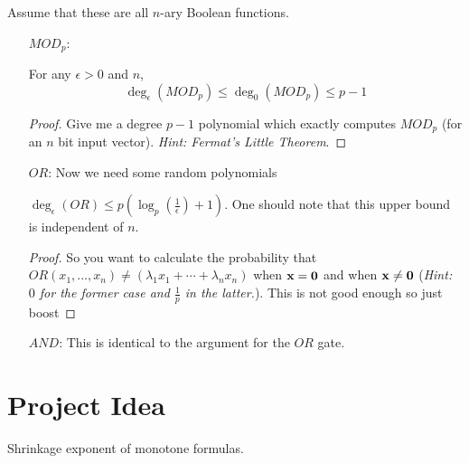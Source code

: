 \documentclass[11pt]{article}
\begin{document}
	Assume that these are all $n$-ary Boolean functions.
	\begin{enumerate}
		\item[$MOD_p$:]
		\begin{lemma}
			For any $\epsilon > 0$ and $n$,
			\[\deg_{\epsilon}(MOD_p) \leq \deg_{0}(MOD_p) \leq p-1\]
		\end{lemma}
		\begin{proof}
			Give me a degree $p-1$ polynomial which exactly computes $MOD_p$ (for an $n$ bit input vector). \emph{Hint: Fermat's Little Theorem}.
		\end{proof}
		\item[$OR$:] Now we need some random polynomials
		\begin{lemma}
			$\deg_{\epsilon}(OR) \leq p\left(\log_p\left(\frac{1}{\epsilon}\right) + 1\right)$. One should note that this upper bound is independent of $n$.
		\end{lemma}
		\begin{proof}
			So you want to calculate the probability that $OR(x_1, ..., x_n) \neq (\lambda_1x_1 + \cdots + \lambda_nx_n)$ when $\mathbf{x} = \mathbf{0}$ and when $\mathbf{x} \neq \mathbf{0}$ (\emph{Hint: $0$ for the former case and $\frac{1}{p}$ in the latter.}). This is not good enough so just boost
		\end{proof}
		\item[$AND$:] This is identical to the argument for the $OR$ gate. 
	\end{enumerate}
	
\section{Project Idea}
	Shrinkage exponent of monotone formulas. 
\end{document}
